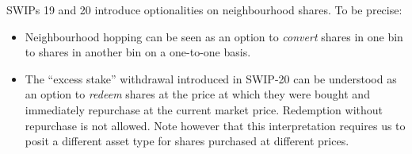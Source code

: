   SWIPs 19 and 20 introduce optionalities on neighbourhood shares. To be precise:
  \begin{itemize}
    \item Neighbourhood hopping can be seen as an option to \emph{convert} shares in one bin to shares in another bin on a one-to-one basis.
    \item The ``excess stake'' withdrawal introduced in SWIP-20 can be understood as an option to \emph{redeem} shares at the price at which they were bought and immediately repurchase at the current market price.
    Redemption without repurchase is not allowed.
    Note however that this interpretation requires us to posit a different asset type for shares purchased at different prices.
  \end{itemize}
\begin{comment}
\subsubsection*{Assumptions of the current model}

This month we were able to lift some of the assumptions of the model we studied in August, but quite a few remain:
\begin{itemize}
  \item Perfect information: all players know the strategies of the other players at all future steps. Perhaps a more realistic approach is to model the mechanism as a (dynamic) Bayes game of incomplete information.
  \item Stationarity: the (expected) revenue of the target neighbourhood remains constant. In reality, expected revenue is affected by network demand, the decisions of stakers via the price oracle, and the price of competing services.
  Similarly, operational costs depend on the costs of hardware and electricity.
  \item We considered all costs and rewards as BZZ denominated. But operational costs and the time preference discount rate $r$ are more easily modelled in terms of fiat currency.
  \item We didn't model any time delays between stake top-ups and reward weight updates.
  \item We didn't model the risk of being frozen or slashed due to liveness failures.
  \item We didn't incorporate changes to the gate function introduced in SWIP-20.
  \item We assumed the neighbourhood count remains constant.
\end{itemize}
\end{comment}
